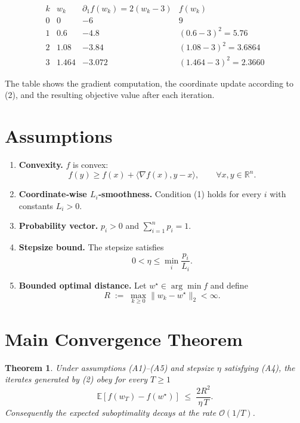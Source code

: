 \documentclass{article}
\newtheorem{theorem}{Theorem}
\newcommand{\E}{\mathbb{E}}
\newcommand{\R}{\mathbb{R}}
\begin{document}
\[
\begin{array}{c|c|c|c}
k & w_{k} & \partial_{1}f(w_{k})=2(w_{k}-3) & f(w_{k}) \\ \hline
0 & 0      & -6          & 9   \\
1 & 0.6    & -4.8        & (0.6-3)^{2}=5.76 \\
2 & 1.08   & -3.84       & (1.08-3)^{2}=3.6864 \\
3 & 1.464  & -3.072      & (1.464-3)^{2}=2.3660
\end{array}
\]

The table shows the gradient computation, the coordinate update according to (2), and the resulting objective value after each iteration.

\section*{Assumptions}
\begin{enumerate}
\item \textbf{Convexity.} $f$ is convex:
\[
f(y)\ge f(x)+\langle \nabla f(x),y-x\rangle,\qquad\forall x,y\in\R^{n}.
\tag{A1}
\]
\item \textbf{Coordinate‑wise $L_i$‑smoothness.} Condition (1) holds for every $i$ with constants $L_i>0$.
\item \textbf{Probability vector.} $p_i>0$ and $\sum_{i=1}^{n}p_i=1$.
\item \textbf{Stepsize bound.} The stepsize satisfies
\[
0<\eta\le \min_{i}\frac{p_i}{L_i}.
\tag{A4}
\]
\item \textbf{Bounded optimal distance.} Let $w^{\star}\in\arg\min f$ and define
\[
R\;:=\;\max_{k\ge0}\|w_{k}-w^{\star}\|_{2}<\infty .
\tag{A5}
\]
\end{enumerate}

\section*{Main Convergence Theorem}
\begin{theorem}
\label{thm:main}
Under assumptions (A1)–(A5) and stepsize $\eta$ satisfying (A4), the iterates generated by (2) obey for every $T\ge1$
\[
\E\!\left[f(w_{T})-f(w^{\star})\right]\;\le\;
\frac{2R^{2}}{\eta\,T}.
\tag{4}
\]
Consequently the expected suboptimality decays at the rate $\mathcal{O}(1/T)$.
\end{theorem}
\end{document}
